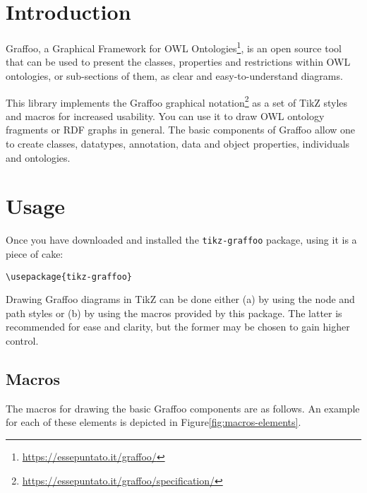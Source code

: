 \section{Introduction}

Graffoo, a Graphical Framework for OWL Ontologies\footnote{\url{https://essepuntato.it/graffoo/}}, is an open source tool that can be used to present the classes, properties and restrictions within OWL ontologies, or sub-sections of them, as clear and easy-to-understand diagrams.

This library implements the Graffoo graphical notation\footnote{\url{https://essepuntato.it/graffoo/specification/}} as a set of TikZ styles and macros for increased usability. You can use it to draw OWL ontology fragments or RDF graphs in general. The basic components of Graffoo allow one to create classes, datatypes, annotation, data and object properties, individuals and ontologies.

\section{Usage}
Once you have downloaded and installed the \texttt{tikz-graffoo} package, using
it is a piece of cake:

\verb|\usepackage{tikz-graffoo}|

Drawing Graffoo diagrams in TikZ can be done either (a) by using the node and path styles or (b) by using the macros provided by this package. The latter is recommended for ease and clarity, but the former may be chosen to gain higher control. 


\subsection{Macros}

The macros for drawing the basic Graffoo components are as follows. An example for each of these elements is depicted in Figure\ref{fig:macros-elements}.

